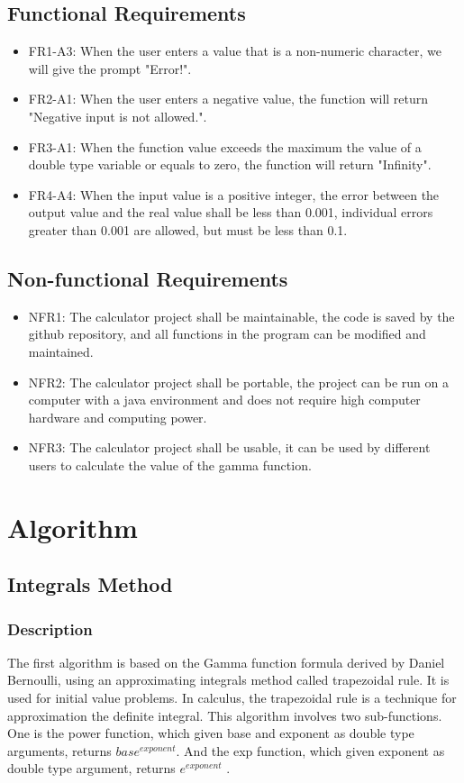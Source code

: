 \documentclass{report}
\begin{document}
\subsection{Functional Requirements}
\begin{itemize}
\item FR1-A3: When the user enters a value that is a non-numeric character, we will give the prompt "Error!". 
\item FR2-A1: When the user enters a negative value, the function will return "Negative input is not allowed.".
\item FR3-A1: When the function value exceeds the maximum the value of a double type variable or equals to zero, the function will return "Infinity".
\item FR4-A4: When the input value is a positive integer, the error between the output value and the real value shall be less than 0.001, individual errors greater than 0.001 are allowed, but must be less than 0.1.
\end{itemize}

\subsection{Non-functional Requirements}
\begin{itemize}
\item NFR1: The calculator project shall be maintainable, the code is saved by the github repository, and all functions in the program can be modified and maintained.
\item NFR2: The calculator project shall be portable, the project can be run on a computer with a java environment and does not require high computer hardware and computing power.
\item NFR3: The calculator project shall be usable, it can be used by different users to calculate the value of the gamma function.
\end{itemize}

\section{Algorithm}
\subsection{Integrals Method}
\subsubsection{Description}
The first algorithm is based on the Gamma function formula derived by Daniel Bernoulli, using an approximating integrals method called trapezoidal rule\cite{enwiki:1095730995}. It is used for initial value problems. In calculus, the trapezoidal rule is a technique for approximation the definite integral. This algorithm involves two sub-functions. One is the power function, which given base and exponent as double type arguments, returns $base^{exponent}$. And the exp function, which given exponent as double type argument, returns $e^{exponent}$ .
\end{document}
